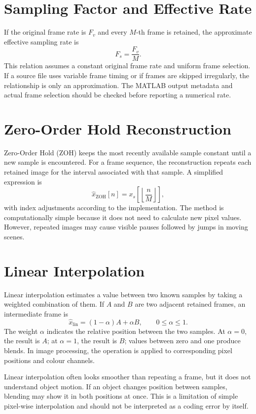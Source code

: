 \documentclass[12pt,a4paper,oneside]{report}
\begin{document}
\section{Sampling Factor and Effective Rate}
If the original frame rate is $F_v$ and every $M$-th frame is retained, the approximate effective sampling rate is
\[
F_s = \frac{F_v}{M}.
\]
This relation assumes a constant original frame rate and uniform frame selection. If a source file uses variable frame timing or if frames are skipped irregularly, the relationship is only an approximation. The MATLAB output metadata and actual frame selection should be checked before reporting a numerical rate.

\section{Zero-Order Hold Reconstruction}
Zero-Order Hold (ZOH) keeps the most recently available sample constant until a new sample is encountered. For a frame sequence, the reconstruction repeats each retained image for the interval associated with that sample. A simplified expression is
\[
\hat{x}_{\mathrm{ZOH}}[n] = x_s\!\left[\left\lfloor\frac{n}{M}\right\rfloor\right],
\]
with index adjustments according to the implementation. The method is computationally simple because it does not need to calculate new pixel values. However, repeated images may cause visible pauses followed by jumps in moving scenes.

\section{Linear Interpolation}
Linear interpolation estimates a value between two known samples by taking a weighted combination of them. If $A$ and $B$ are two adjacent retained frames, an intermediate frame is
\[
\hat{x}_{\mathrm{lin}} = (1-\alpha)A + \alpha B, \qquad 0\leq\alpha\leq1.
\]
The weight $\alpha$ indicates the relative position between the two samples. At $\alpha=0$, the result is $A$; at $\alpha=1$, the result is $B$; values between zero and one produce blends. In image processing, the operation is applied to corresponding pixel positions and colour channels.

Linear interpolation often looks smoother than repeating a frame, but it does not understand object motion. If an object changes position between samples, blending may show it in both positions at once. This is a limitation of simple pixel-wise interpolation and should not be interpreted as a coding error by itself.
\end{document}
